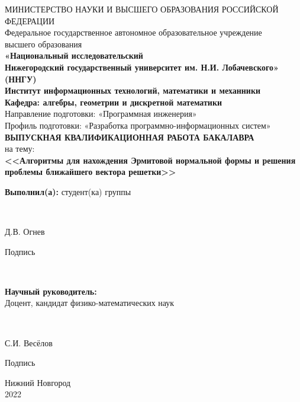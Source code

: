 \begin{titlepage}
\newpage

\begin{center}
	МИНИСТЕРСТВО НАУКИ И ВЫСШЕГО ОБРАЗОВАНИЯ РОССИЙСКОЙ ФЕДЕРАЦИИ \\
	\fontsize{14}{12}\selectfont
	Федеральное государственное автономное образовательное учреждение\\ высшего образования \\
	
	\textbf
	{«Национальный исследовательский \\ Нижегородский государственный
	 университет им. Н.И. Лобачевского» \\ (ННГУ)} \\
	\hfill \break
	\hfill \break
	\hfill \break
	\textbf{Институт информационных технологий, математики и механники} \\
	\hfill \break
	\hfill \break
	\textbf{Кафедра: алгебры, геометрии и дискретной математики} \\
	\hfill \break
	\hfill \break
	Направление подготовки: «Программная инженерия» \\
	\fontsize{13}{12}\selectfont
	Профиль подготовки: «Разработка программно-информационных систем» \\
	\fontsize{14}{12}\selectfont
	\hfill \break
	\hfill \break
	\hfill \break
	\textbf{ВЫПУСКНАЯ КВАЛИФИКАЦИОННАЯ РАБОТА БАКАЛАВРА} \\
	\vspace{1em}
	на тему: \\
	\textbf{<<Алгоритмы для нахождения Эрмитовой нормальной формы и решения проблемы ближайшего вектора решетки>>} \\
\end{center}

\vspace{7em}

\fontsize{14}{12}\selectfont
\hfill\parbox{8cm}{
	\textbf{Выполнил(а):} студент(ка) группы \makebox[1cm]{\hrulefill}
} \\
\vspace{1em}
\hfill\parbox{7cm}{
	\underline{\hspace{4cm}} Д.В. Огнев
	\begin{center}
	Подпись
	\end{center}
}\\
\vspace{1em}
\hfill\parbox{8cm}{
	\textbf{Научный руководитель:} \\
	Доцент, кандидат физико-математических наук
} \\
\vspace{1em}
\hfill\parbox{7cm}{
	\underline{\hspace{4cm}} С.И. Весёлов
	\begin{center}
	Подпись
	\end{center}
}


\vspace{\fill}

\begin{center}
Нижний Новгород \\2022
\end{center}

\end{titlepage}
\clearpage